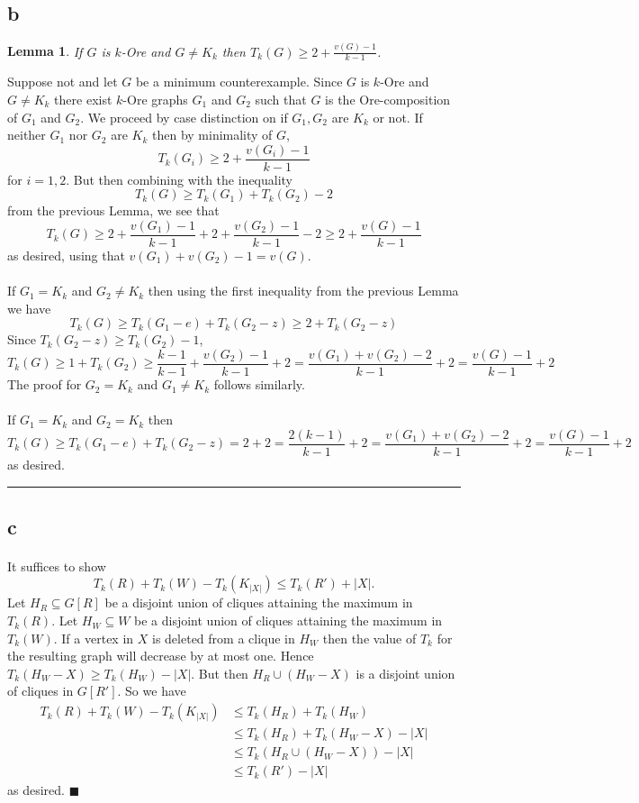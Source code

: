 \documentclass[letterpaper,12pt,oneside,onecolumn]{article}
\newenvironment{proof}{{\bf Proof:  }}{\hfill\rule{2mm}{2mm}}
\newtheorem{lemma}[fact]{Lemma}
\begin{document}
\subsection{b}
\begin{lemma}
If $G$ is $k$-Ore and $G \neq K_k$ then $T_k(G) \geq 2+ \frac{v(G) - 1}{k-1}$.
\end{lemma}
\begin{proof}
Suppose not and let $G$ be a minimum counterexample. Since $G$ is $k$-Ore and $G\neq K_k$ there exist $k$-Ore graphs $G_1$ and $G_2$ such that $G$ is the Ore-composition of $G_1$ and $G_2$. We proceed by case distinction on if $G_1, G_2$ are $K_k$ or not. If neither $G_1$ nor $G_2$ are $K_k$ then by minimality of $G$,
$$T_k(G_i) \geq 2 + \frac{v(G_i) - 1}{k-1}$$
for $i =1,2$. But then combining with the inequality
$$T_k(G) \geq T_k(G_1) + T_k(G_2) - 2$$
from the previous Lemma, we see that
$$T_k(G) \geq 2 + \frac{v(G_1) - 1}{k-1} + 2 + \frac{v(G_2) - 1}{k-1} -2 \geq 2 + \frac{v(G)-1}{k-1}$$
as desired, using that $v(G_1) + v(G_2) -1 = v(G)$.
\paragraph{}
If $G_1 = K_k$ and $G_2 \neq K_k$ then using the first inequality from the previous Lemma we have
$$T_k(G) \geq T_k(G_1-e) + T_k(G_2-z) \geq 2 + T_k(G_2-z)$$
Since $T_k(G_2-z) \geq T_k(G_2) - 1$, 
$$T_k(G) \geq 1 + T_k(G_2) \geq \frac{k-1}{k-1} + \frac{v(G_2)-1}{k-1} + 2= \frac{v(G_1) + v(G_2) - 2}{k-1} +2 = \frac{v(G) - 1}{k-1} +2$$
The proof for $G_2 = K_k$ and $G_1 \neq K_k$ follows similarly.
\paragraph{}
If $G_1 = K_k$ and $G_2 = K_k$ then 
$$T_k(G) \geq T_k(G_1-e) + T_k(G_2 - z) = 2  + 2 = \frac{2(k-1)}{k-1} + 2 = \frac{v(G_1) + v(G_2) -2}{k-1} + 2 = \frac{v(G) -1}{k-1} + 2$$
as desired.
\end{proof}
\subsection{c}
\paragraph{}
It suffices to show
$$T_k(R) + T_k(W) - T_k(K_{|X|}) \leq T_k(R') + |X|.$$
Let $H_R \subseteq G[R]$ be a disjoint union of cliques attaining the maximum in $T_k(R)$. Let $H_W \subseteq W$ be a disjoint union of cliques attaining the maximum in $T_k(W)$. If a vertex in $X$ is deleted from a clique in $H_W$ then the value of $T_k$ for the resulting graph will decrease by at most one. Hence $T_k(H_W - X) \geq T_k(H_W) - |X|$. But then $H_R \cup (H_W - X)$ is a disjoint union of cliques in $G[R']$. So we have
\begin{align*}
T_k(R) + T_k(W) - T_k(K_{|X|}) &\leq T_k(H_R) + T_k(H_W)\\ &\leq T_k(H_R) + T_k(H_W - X) - |X|\\ &\leq T_k(H_R \cup (H_W-X)) - |X|\\ &\leq T_k(R') - |X|\end{align*}
as desired. $\blacksquare$
\newpage
\end{document}
